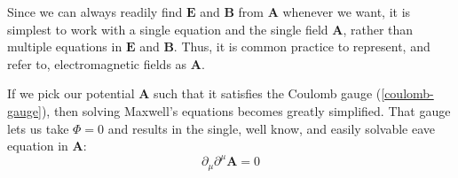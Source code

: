 Since we can always readily find $\mathbf{E}$ and $\mathbf{B}$ from $\mathbf{A}$ whenever we want, it is simplest to work with a single equation and the single field $\mathbf{A}$, rather than multiple equations in $\mathbf{E}$ and $\mathbf{B}$. Thus, it is common practice to represent, and refer to, electromagnetic fields as $\mathbf{A}$.
\begin{qt}
    If we pick our potential $\mathbf{A}$ such that it satisfies the Coulomb gauge (\ref{coulomb-gauge}), then solving Maxwell's equations becomes greatly simplified. That gauge lets us take $\Phi=0$ and results in the single, well know, and  easily solvable eave equation in $\mathbf{A}$:
    \begin{equation}
\partial_{\mu} \partial^{\mu} \mathbf{A}=0
\end{equation}
\end{qt}
